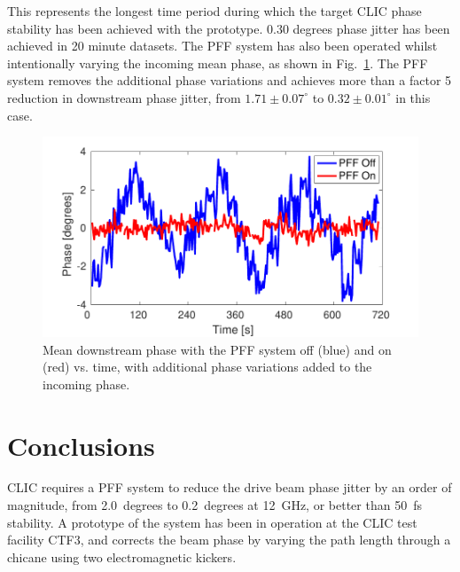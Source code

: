 \documentclass[%
 reprint,
 amsmath,amssymb,
 prl,
]{revtex4-1}
\begin{document}
This represents the longest time period during which the target CLIC phase 
stability has been achieved with the prototype. 0.30 degrees phase jitter has 
been achieved in 20 minute datasets. The PFF system has also been operated 
whilst intentionally varying the incoming mean phase, as shown in 
Fig.~\ref{fig:wiggle}. The PFF system removes the additional phase variations 
and achieves more than a factor 5 reduction in downstream phase jitter, from 
\(1.71\pm0.07^\circ\) to \(0.32\pm0.01^\circ\) in this case.

\begin{figure}
	\includegraphics[width=\columnwidth]{figs/wiggle}
	\caption{\label{fig:wiggle}Mean downstream phase with the PFF system off 
		(blue) and on (red) vs. time, with additional phase variations added to 
		the 
		incoming phase.}
\end{figure}

%
%
%

\section{\label{s:conc}Conclusions}

CLIC requires a PFF system to reduce the drive beam phase jitter by an order of 
magnitude, from 2.0~degrees to 0.2~degrees at 12~GHz, or better than 50~fs 
stability. A prototype of the system has been 
in operation at the CLIC test facility CTF3, and corrects the beam phase by 
varying the path length through a chicane using two electromagnetic kickers. 
\end{document}
